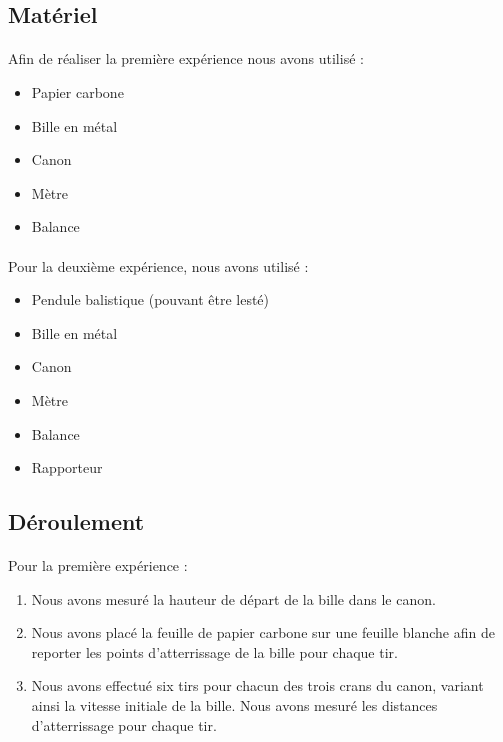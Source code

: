 \documentclass[11pt]{article}
\begin{document}
\subsection{Matériel}
\paragraph*{} Afin de réaliser la première expérience nous avons utilisé :
\begin{itemize}
\item Papier carbone
\item Bille en métal
\item Canon  
\item Mètre
\item Balance
\end{itemize}
\paragraph*{} Pour la deuxième expérience, nous avons utilisé :
\begin{itemize}
\item Pendule balistique (pouvant être lesté)
\item Bille en métal
\item Canon  
\item Mètre
\item Balance
\item Rapporteur
\end{itemize}

\subsection{Déroulement}
\paragraph*{} Pour la première expérience :
\begin{enumerate}
\item Nous avons mesuré la hauteur de départ de la bille dans le canon.
\item Nous avons placé la feuille de papier carbone sur une feuille blanche afin de reporter les points d'atterrissage de la bille pour chaque tir.
\item Nous avons effectué six tirs pour chacun des trois crans du canon, variant ainsi la vitesse initiale de la bille. Nous avons mesuré les distances d'atterrissage pour chaque tir. 
\end{enumerate}
\end{document}
